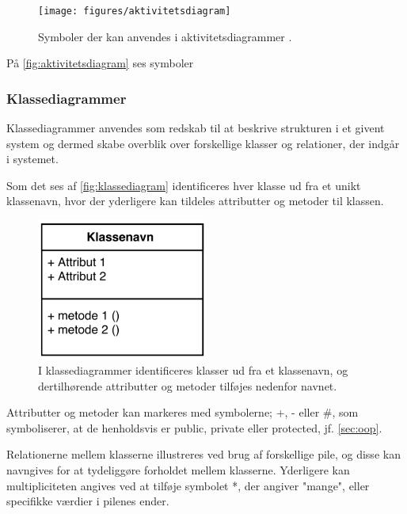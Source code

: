 \begin{figure} [H]
\centering
\texttt{[image: figures/aktivitetsdiagram]}
\caption{Symboler der kan anvendes i aktivitetsdiagrammer \cite{Fowler2014}.}
\label{fig:aktivitetsdiagram}
\end{figure}

\noindent
På \autoref{fig:aktivitetsdiagram} ses symboler 




\subsubsection{Klassediagrammer}
Klassediagrammer anvendes som redskab til at beskrive strukturen i et givent system og dermed skabe overblik over forskellige klasser og relationer, der indgår i systemet. 

Som det ses af \autoref{fig:klassediagram} identificeres hver klasse ud fra et unikt klassenavn, hvor der yderligere kan tildeles attributter og metoder til klassen.

\begin{figure} [H]
\centering
\includegraphics[width=0.5\textwidth]{figures/klassediag}
\caption{I klassediagrammer identificeres klasser ud fra et klassenavn, og dertilhørende attributter og metoder tilføjes nedenfor navnet.}
\label{fig:klassediagram}
\end{figure}

\noindent
Attributter og metoder kan markeres med symbolerne; +, - eller #, som symboliserer, at de henholdsvis er public, private eller protected, jf. \autoref{sec:oop}.

Relationerne mellem klasserne illustreres ved brug af forskellige pile, og disse kan navngives for at tydeliggøre forholdet mellem  klasserne. Yderligere kan multipliciteten angives ved at tilføje symbolet *, der angiver "mange", eller specifikke værdier i pilenes ender. 